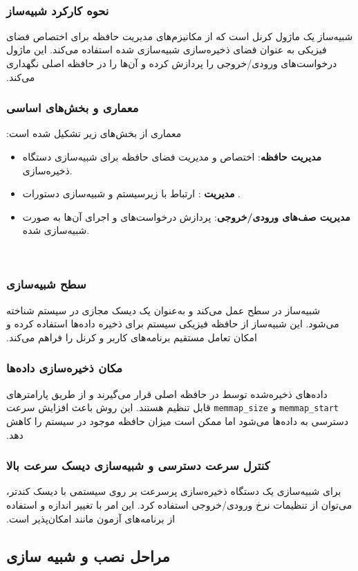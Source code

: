 ‫
‫\subsubsection*{نحوه کارکرد شبیه‌ساز}
‫شبیه‌ساز  یک ماژول کرنل است که از مکانیزم‌های مدیریت حافظه برای اختصاص فضای فیزیکی به عنوان فضای ذخیره‌سازی شبیه‌سازی شده استفاده می‌کند. این ماژول درخواست‌های ورودی/خروجی را پردازش کرده و آن‌ها را در حافظه اصلی نگهداری می‌کند.
‫
‫\subsubsection*{معماری و بخش‌های اساسی}
‫معماری  از بخش‌های زیر تشکیل شده است:
‫\begin{itemize}
‫	\item \textbf{مدیریت حافظه}: اختصاص و مدیریت فضای حافظه برای شبیه‌سازی دستگاه ذخیره‌سازی.
‫	\item \textbf{مدیریت }: ارتباط با زیرسیستم  و شبیه‌سازی دستورات .
‫	\item \textbf{مدیریت صف‌های ورودی/خروجی}: پردازش درخواست‌های  و اجرای آن‌ها به صورت شبیه‌سازی شده.
‫\end{itemize}
‫
‫\subsubsection*{سطح شبیه‌سازی}
‫شبیه‌ساز  در سطح  عمل می‌کند و به‌عنوان یک دیسک مجازی  در سیستم شناخته می‌شود. این شبیه‌ساز از حافظه فیزیکی سیستم برای ذخیره داده‌ها استفاده کرده و امکان تعامل مستقیم برنامه‌های کاربر و کرنل را فراهم می‌کند.
‫
‫\subsubsection*{مکان ذخیره‌سازی داده‌ها}
‫داده‌های ذخیره‌شده توسط  در حافظه اصلی قرار می‌گیرند و از طریق پارامترهای \texttt{memmap\_start} و \texttt{memmap\_size} قابل تنظیم هستند. این روش باعث افزایش سرعت دسترسی به داده‌ها می‌شود اما ممکن است میزان حافظه موجود در سیستم را کاهش دهد.
‫
‫\subsubsection*{کنترل سرعت دسترسی و شبیه‌سازی دیسک سرعت بالا}
‫برای شبیه‌سازی یک دستگاه ذخیره‌سازی پرسرعت بر روی سیستمی با دیسک کندتر، می‌توان از تنظیمات نرخ ورودی/خروجی استفاده کرد. این امر با تغییر اندازه  و استفاده از برنامه‌های آزمون مانند  امکان‌پذیر است.
‫
‫‫\subsection*{مراحل نصب و شبیه سازی}
